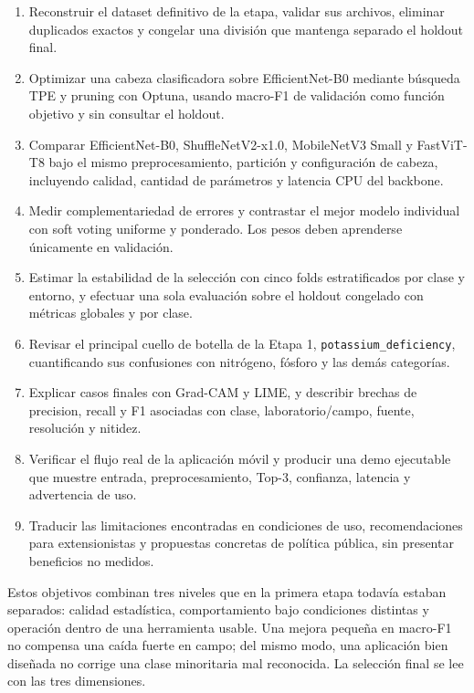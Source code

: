 \begin{enumerate}
  \item Reconstruir el dataset definitivo de la etapa, validar sus archivos,
  eliminar duplicados exactos y congelar una división que mantenga separado el
  holdout final.

  \item Optimizar una cabeza clasificadora sobre EfficientNet-B0 mediante
  búsqueda TPE y pruning con Optuna, usando macro-F1 de validación como función
  objetivo y sin consultar el holdout.

  \item Comparar EfficientNet-B0, ShuffleNetV2-x1.0, MobileNetV3 Small y
  FastViT-T8 bajo el mismo preprocesamiento, partición y configuración de
  cabeza, incluyendo calidad, cantidad de parámetros y latencia CPU del
  backbone.

  \item Medir complementariedad de errores y contrastar el mejor modelo
  individual con soft voting uniforme y ponderado. Los pesos deben aprenderse
  únicamente en validación.

  \item Estimar la estabilidad de la selección con cinco folds estratificados
  por clase y entorno, y efectuar una sola evaluación sobre el holdout
  congelado con métricas globales y por clase.

  \item Revisar el principal cuello de botella de la Etapa 1,
  \texttt{potassium\_deficiency}, cuantificando sus confusiones con nitrógeno,
  fósforo y las demás categorías.

  \item Explicar casos finales con Grad-CAM y LIME, y describir brechas de
  precision, recall y F1 asociadas con clase, laboratorio/campo, fuente,
  resolución y nitidez.

  \item Verificar el flujo real de la aplicación móvil y producir una demo
  ejecutable que muestre entrada, preprocesamiento, Top-3, confianza, latencia
  y advertencia de uso.

  \item Traducir las limitaciones encontradas en condiciones de uso,
  recomendaciones para extensionistas y propuestas concretas de política
  pública, sin presentar beneficios no medidos.
\end{enumerate}

Estos objetivos combinan tres niveles que en la primera etapa todavía estaban
separados: calidad estadística, comportamiento bajo condiciones distintas y
operación dentro de una herramienta usable. Una mejora pequeña en macro-F1 no
compensa una caída fuerte en campo; del mismo modo, una aplicación bien
diseñada no corrige una clase minoritaria mal reconocida. La selección final se
lee con las tres dimensiones.

